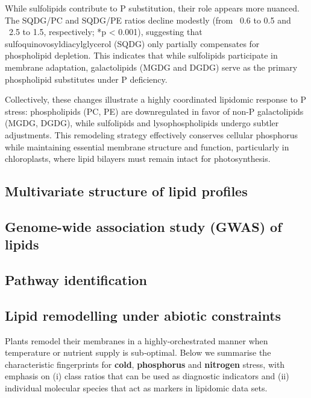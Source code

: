 \documentclass[10pt,letterpaper]{article}
\begin{document}
While sulfolipids contribute to P substitution, their role appears more nuanced. The SQDG/PC and SQDG/PE ratios decline modestly (from ~0.6 to 0.5 and ~2.5 to 1.5, respectively; *p < 0.001), suggesting that sulfoquinovosyldiacylglycerol (SQDG) only partially compensates for phospholipid depletion. This indicates that while sulfolipids participate in membrane adaptation, galactolipids (MGDG and DGDG) serve as the primary phospholipid substitutes under P deficiency.

Collectively, these changes illustrate a highly coordinated lipidomic response to P stress: phospholipids (PC, PE) are downregulated in favor of non-P galactolipids (MGDG, DGDG), while sulfolipids and lysophospholipids undergo subtler adjustments. This remodeling strategy effectively conserves cellular phosphorus while maintaining essential membrane structure and function, particularly in chloroplasts, where lipid bilayers must remain intact for photosynthesis.





\subsection*{Multivariate structure of lipid profiles}

\subsection*{Genome-wide association study (GWAS) of lipids}

\subsection*{Pathway identification}

\subsection*{Lipid remodelling under abiotic constraints}

Plants remodel their membranes in a highly‐orchestrated manner when temperature or nutrient supply is sub‑optimal.  Below we summarise the characteristic fingerprints for \textbf{cold}, \textbf{phosphorus} and \textbf{nitrogen} stress, with emphasis on (i) class ratios that can be used as diagnostic indicators and (ii) individual molecular species that act as markers in lipidomic data sets.

\end{document}
